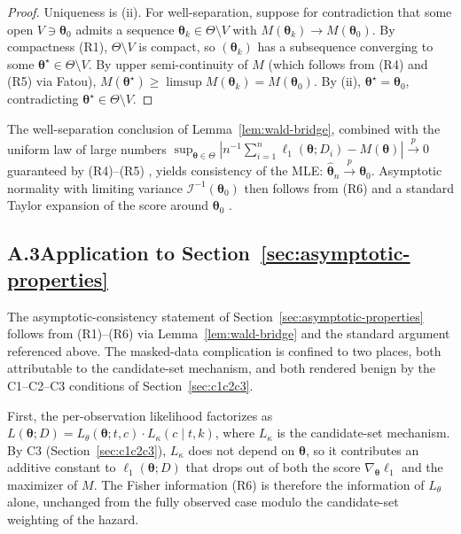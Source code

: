 \documentclass[11pt]{article}
\theoremstyle{definition}
\theoremstyle{plain}
\renewcommand{\v}[1]{\boldsymbol{#1}}
\begin{document}
\begin{proof}
Uniqueness is (ii). For well-separation, suppose for contradiction
that some open $V \ni \v{\theta}_0$ admits a sequence
$\v{\theta}_k \in \Theta \setminus V$ with $M(\v{\theta}_k) \to
M(\v{\theta}_0)$. By compactness (R1), $\Theta \setminus V$ is
compact, so $(\v{\theta}_k)$ has a subsequence converging to some
$\v{\theta}^\star \in \Theta \setminus V$. By upper semi-continuity
of $M$ (which follows from (R4) and (R5) via Fatou),
$M(\v{\theta}^\star) \ge \limsup M(\v{\theta}_k) = M(\v{\theta}_0)$.
By (ii), $\v{\theta}^\star = \v{\theta}_0$, contradicting
$\v{\theta}^\star \in \Theta \setminus V$.
\end{proof}

The well-separation conclusion of Lemma~\ref{lem:wald-bridge}, combined
with the uniform law of large numbers
$\sup_{\v{\theta} \in \Theta} |n^{-1} \sum_{i=1}^n \ell_1(\v{\theta};
D_i) - M(\v{\theta})| \xrightarrow{p} 0$ guaranteed by (R4)--(R5)
\citep[Theorem~5.7]{vandervaart1998asymptotic}, yields consistency of
the MLE: $\hat{\v{\theta}}_n \xrightarrow{p} \v{\theta}_0$. Asymptotic
normality with limiting variance $\mathcal{I}^{-1}(\v{\theta}_0)$ then
follows from (R6) and a standard Taylor expansion of the score around
$\v{\theta}_0$ \citep[Theorem~5.39]{vandervaart1998asymptotic}.

\subsection*{A.3\quad Application to Section~\ref{sec:asymptotic-properties}}

The asymptotic-consistency statement of
Section~\ref{sec:asymptotic-properties} follows from (R1)--(R6) via
Lemma~\ref{lem:wald-bridge} and the standard argument referenced
above. The masked-data complication is confined to two places, both
attributable to the candidate-set mechanism, and both rendered benign
by the C1--C2--C3 conditions of Section~\ref{sec:c1c2c3}.

First, the per-observation likelihood factorizes as
$L(\v{\theta}; D) = L_\theta(\v{\theta}; t, c) \cdot
L_\kappa(c \mid t, k)$, where $L_\kappa$ is the candidate-set
mechanism. By C3 (Section~\ref{sec:c1c2c3}), $L_\kappa$ does not
depend on $\v{\theta}$, so it contributes an additive constant to
$\ell_1(\v{\theta}; D)$ that drops out of both the score
$\nabla_{\v{\theta}} \ell_1$ and the maximizer of $M$. The Fisher
information (R6) is therefore the information of $L_\theta$ alone,
unchanged from the fully observed case modulo the candidate-set
weighting of the hazard.
\end{document}
